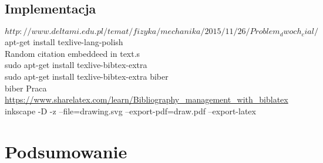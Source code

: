 \documentclass[14pt,twoside,a4paper]{article}
\begin{document}
\subsection{\Large Implementacja}

$http://www.deltami.edu.pl/temat/fizyka/mechanika/2015/11/26/Problem_dwoch_cial/$
\bigskip
apt-get install texlive-lang-polish\\
Random citation embeddeed in text.s\\
 sudo apt-get install texlive-bibtex-extra\\
 sudo apt-get install texlive-bibtex-extra biber\\
biber Praca\\
\url{https://www.sharelatex.com/learn/Bibliography_management_with_biblatex}\\
inkscape -D -z --file=drawing.svg --export-pdf=draw.pdf --export-latex


\section{\LARGE Podsumowanie}

\newpage

\nocite{*}
\printbibliography
\end{document}
